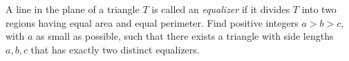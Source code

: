 A line in the plane of a triangle $T$ is called an \emph{equalizer} if it divides $T$ into two regions having equal area and equal perimeter. Find positive integers $a>b>c$, with $a$ as small as possible, such that there exists a triangle with side lengths $a, b, c$ that has exactly two distinct equalizers.
